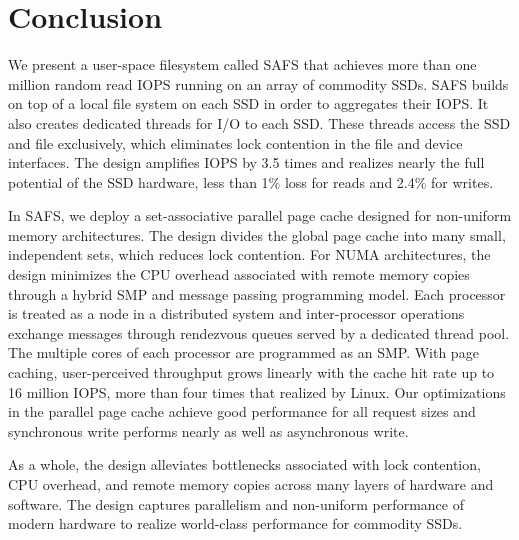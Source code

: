 
\section{Conclusion}
We present a user-space filesystem called SAFS that achieves more than one million
random read IOPS running on an array of commodity SSDs. SAFS builds on top of 
a local file system on each SSD in order to aggregates their IOPS.
It also creates dedicated threads for I/O to each SSD.  These threads
access the SSD and file exclusively, which eliminates lock contention 
in the file and device interfaces.
The design amplifies IOPS by 3.5 times and realizes nearly the 
full potential of the SSD hardware, less than 1\% loss for reads
and 2.4\% for writes.

In SAFS, we deploy a set-associative parallel
page cache designed for non-uniform memory architectures.  
The design divides the global page cache into many small, independent
sets, which reduces lock contention.  For NUMA architectures, the 
design minimizes the CPU overhead associated with remote memory copies 
through a hybrid SMP and message passing programming model. Each processor
is treated as a node in a distributed system and inter-processor operations
exchange messages through rendezvous queues served by a dedicated thread pool.
The multiple cores of each processor are programmed as an SMP.
With page caching, user-perceived throughput grows linearly with the 
cache hit rate up to 16 million IOPS, more than four times that realized
by Linux. Our optimizations in the parallel page cache achieve good performance
for all request sizes and synchronous write performs nearly as well as
asynchronous write.

As a whole, the design alleviates bottlenecks associated with lock contention,
CPU overhead, and remote memory copies across many layers of hardware and
software.  The design captures parallelism and non-uniform performance of
modern hardware to realize world-class performance for commodity SSDs.
